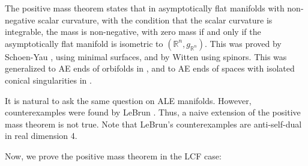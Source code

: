 \documentclass[12pt]{amsart}
\theoremstyle{definition}
\begin{document}
The positive mass theorem states that in asymptotically flat manifolds with non-negative scalar curvature, with the condition that the scalar curvature is integrable, the mass is non-negative, with zero mass if and only if the asymptotically flat manifold is isometric to $(\mathbb{R}^n, g_{\mathbb{R}^n})$. This was proved by Schoen-Yau \cite{SYPMT1}, \cite{SYPMT2} using minimal surfaces, and by Witten \cite{Witten} using spinors. This was generalized to AE ends of orbifolds in \cite{ju2023conformally}, and to AE ends of spaces with isolated conical singularities in \cite{dai2025positive}.

It is natural to ask the same question on ALE manifolds. However, counterexamples were found by LeBrun \cite{Lebrun}. Thus, a naive extension of the positive mass theorem is not true. Note that LeBrun's counterexamples are anti-self-dual in real dimension 4.

Now, we prove the positive mass theorem in the LCF case:
\end{document}
